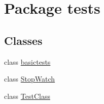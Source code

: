 \hypertarget{namespacetests}{}\section{Package tests}
\label{namespacetests}
\subsection*{Classes}
\begin{DoxyCompactItemize}
\item 
class \mbox{\hyperlink{classtests_1_1basictests}{basictests}}
\item 
class \mbox{\hyperlink{classtests_1_1_stop_watch}{Stop\+Watch}}
\item 
class \mbox{\hyperlink{classtests_1_1_test_class}{Test\+Class}}
\end{DoxyCompactItemize}
